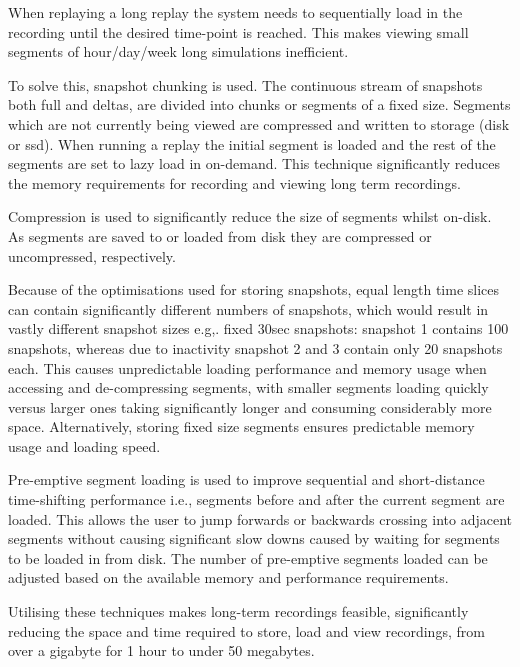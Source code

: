 When replaying a long replay the system needs to sequentially load in the recording until the desired time-point is reached. This makes viewing small segments of hour/day/week long simulations inefficient. 

To solve this, snapshot chunking is used. The continuous stream of snapshots both full and deltas, are divided into chunks or segments of a fixed size. Segments which are not currently being viewed are compressed and written to storage (disk or ssd). When running a replay the initial segment is loaded and the rest of the segments are set to lazy load in on-demand. This technique significantly reduces the memory requirements for recording and viewing long term recordings.

Compression is used to significantly reduce the size of segments whilst on-disk. As segments are saved to or loaded from disk they are compressed or uncompressed, respectively. 

Because of the optimisations used for storing snapshots, equal length time slices can contain significantly different numbers of snapshots, which would result in vastly different snapshot sizes e.g,. fixed 30sec snapshots: snapshot 1 contains 100 snapshots, whereas due to inactivity snapshot 2 and 3 contain only 20 snapshots each. This causes unpredictable loading performance and memory usage when accessing and de-compressing segments, with smaller segments loading quickly versus larger ones taking significantly longer and consuming considerably more space. Alternatively, storing fixed size segments ensures predictable memory usage and loading speed.

Pre-emptive segment loading is used to improve sequential and short-distance time-shifting performance i.e., segments before and after the current segment are loaded. This allows the user to jump forwards or backwards crossing into adjacent segments without causing significant slow downs caused by waiting for segments to be loaded in from disk. The number of pre-emptive segments loaded can be adjusted based on the available memory and performance requirements.

Utilising these techniques makes long-term recordings feasible, significantly reducing the space and time required to store, load and view recordings, from over a gigabyte for 1 hour to under 50 megabytes.  


